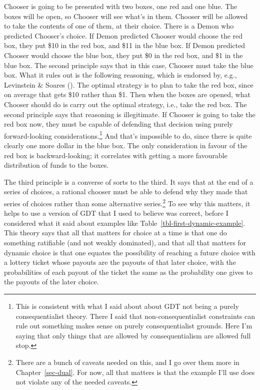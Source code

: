 \documentclass[
  12pt,
  letterpaper,
  DIV=11,
  numbers=noendperiod]{scrreprt}
\begin{document}
Chooser is going to be presented with two boxes, one red and one blue.
The boxes will be open, so Chooser will see what's in them. Chooser will
be allowed to take the contents of one of them, at their choice. There
is a Demon who predicted Chooser's choice. If Demon predicted Chooser
would choose the red box, they put \$10 in the red box, and \$11 in the
blue box. If Demon predicted Chooser would choose the blue box, they put
\$0 in the red box, and \$1 in the blue box. The second principle says
that in this case, Chooser must take the blue box. What it rules out is
the following reasoning, which is endorsed by, e.g., Levinstein \&
Soares (). The optimal strategy
is to plan to take the red box, since on average that gets \$10 rather
than \$1. Then when the boxes are opened, what Chooser should do is
carry out the optimal strategy, i.e., take the red box. The second
principle says that reasoning is illegitimate. If Chooser is going to
take the red box now, they must be capable of defending that decision
using purely forward-looking considerations.\footnote{This is consistent
  with what I said about about GDT not being a purely consequentialist
  theory. There I said that non-consequentialist constraints can rule
  out something makes sense on purely consequentialist grounds. Here I'm
  saying that only things that are allowed by consequentialism are
  allowed full stop.} And that's impossible to do, since there is quite
clearly one more dollar in the blue box. The only consideration in
favour of the red box is backward-looking; it correlates with getting a
more favourable distribution of funds to the boxes.

The third principle is a converse of sorts to the third. It says that at
the end of a series of choices, a rational chooser must be able to
defend why they made that series of choices rather than some alternative
series.\footnote{There are a bunch of caveats needed on this, and I go
  over them more in Chapter~\ref{sec-dual}. For now, all that matters is
  that the example I'll use does not violate any of the needed caveats.}
To see why this matters, it helps to use a version of GDT that I used to
believe was correct, before I considered what it said about examples
like Table~\ref{tbl-first-dynamic-example}. This theory says that all
that matters for choice at a time is that one do something ratifiable
(and not weakly dominated), and that all that matters for dynamic choice
is that one equates the possibility of reaching a future choice with a
lottery ticket whose payouts are the payouts of that later choice, with
the probabilities of each payout of the ticket the same as the
probability one gives to the payouts of the later choice.
\end{document}
